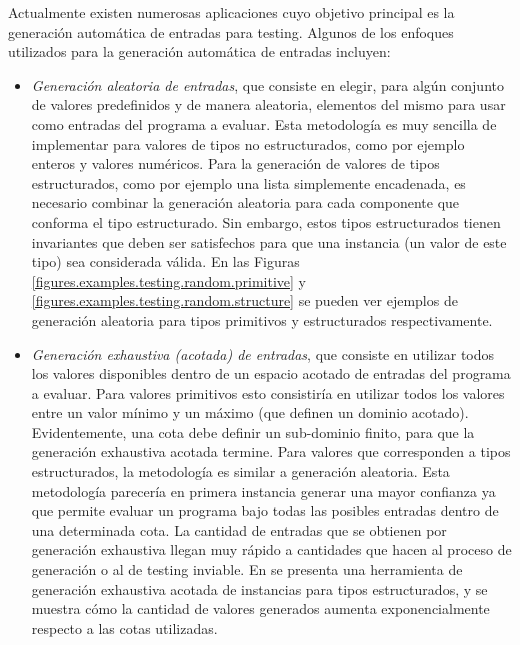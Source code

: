 Actualmente existen numerosas aplicaciones cuyo objetivo principal es la generaci\'on autom\'atica de entradas para testing. Algunos de los enfoques utilizados para la generaci\'on autom\'atica de entradas incluyen:
\begin{itemize}
\item \emph{Generaci\'on aleatoria de entradas}, que consiste en elegir, para alg\'un conjunto de valores predefinidos y de manera aleatoria, elementos del mismo para usar como entradas del programa a evaluar. Esta metodolog\'ia es muy sencilla de implementar para valores de tipos no estructurados, como por ejemplo enteros y valores num\'ericos. Para la generaci\'on de valores de tipos estructurados, como por ejemplo una lista simplemente encadenada, es necesario combinar la generaci\'on aleatoria para cada componente que conforma el tipo estructurado. Sin embargo, estos tipos estructurados tienen invariantes que deben ser satisfechos para que una instancia (un valor de este tipo) sea considerada v\'alida. En las Figuras \ref{figures.examples.testing.random.primitive} y \ref{figures.examples.testing.random.structure} se pueden ver ejemplos de generaci\'on aleatoria para tipos primitivos y estructurados respectivamente. %

\item \emph{Generaci\'on exhaustiva (acotada) de entradas}, que consiste en utilizar todos los valores disponibles dentro de un espacio acotado de entradas del programa a evaluar. Para valores primitivos esto consistir\'ia en utilizar todos los valores entre un valor m\'inimo y un m\'aximo (que definen un dominio acotado). Evidentemente, una cota debe definir un sub-dominio finito, para que la generaci\'on exhaustiva acotada termine. Para valores que corresponden a tipos estructurados, la metodolog\'ia es similar a generaci\'on aleatoria. Esta metodolog\'ia parecer\'ia en primera instancia generar una mayor confianza ya que permite evaluar un programa bajo todas las posibles entradas dentro de una determinada cota. La cantidad de entradas que se obtienen por generaci\'on exhaustiva llegan muy r\'apido a cantidades que hacen al proceso de generaci\'on o al de testing inviable. En \cite{bibliography.testing.generation.KoratBoyapatiKM02} se presenta una herramienta de generaci\'on exhaustiva acotada de instancias para tipos estructurados, y se muestra c\'omo la cantidad de valores generados aumenta exponencialmente respecto a las cotas utilizadas.
\end{itemize}

